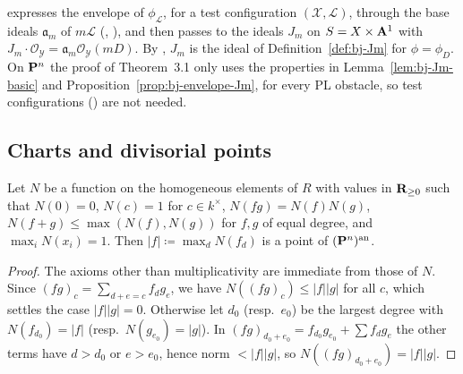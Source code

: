\begin{remark}\label{rmk:bj-test-configurations}
\cite[Proposition~2.5(2)]{FHX} expresses the envelope of $\phi_{\mathcal L}$, for a test configuration
$(\mathcal X,\mathcal L)$, through the base ideals $\mathfrak a_m$ of $m\mathcal L$ (\cite[Lemma~5.22]{BJ22},
\cite[Lemmas~1.6, 1.7]{BJadd}), and \cite[\S3]{FHX} then passes to the ideals $J_m$ on
$S=X\times\mathbf{A}^1$ with $J_m\cdot\mathcal O_{\mathcal Y}=\mathfrak a_m\mathcal O_{\mathcal Y}(mD)$. By
\cite[Lemma~1.7]{BJadd}, $J_m$ is the ideal of Definition~\ref{def:bj-Jm} for $\phi=\phi_D$. On $\mathbf{P}^n$ the
proof of Theorem~3.1 only uses the properties in Lemma~\ref{lem:bj-Jm-basic} and
Proposition~\ref{prop:bj-envelope-Jm}, for every PL obstacle, so test configurations
(\cite[Theorem~2.31]{BJ22}) are not needed.
\end{remark}

\subsection{Charts and divisorial points}

\begin{lemma}\label{lem:bj-graded-extension}
\leanok
{}
Let $N$ be a function on the homogeneous elements of $R$ with values in $\mathbf{R}_{\ge0}$ such that $N(0)=0$,
$N(c)=1$ for $c\in k^\times$, $N(fg)=N(f)N(g)$, $N(f+g)\le\max(N(f),N(g))$ for $f,g$ of equal degree, and
$\max_iN(x_i)=1$. Then $|f|\coloneqq\max_dN(f_d)$ is a point of $(\mathbf{P}^n)^{\mathrm{an}}$.
\end{lemma}

\begin{proof}
The axioms other than multiplicativity are immediate from those of $N$. Since
$(fg)_c=\sum_{d+e=c}f_dg_e$, we have $N((fg)_c)\le|f||g|$ for all $c$, which settles the case $|f||g|=0$. Otherwise
let $d_0$ (resp.\ $e_0$) be the largest degree with $N(f_{d_0})=|f|$ (resp.\ $N(g_{e_0})=|g|$). In
$(fg)_{d_0+e_0}=f_{d_0}g_{e_0}+\sum f_dg_e$ the other terms have $d>d_0$ or $e>e_0$, hence norm $<|f||g|$, so
$N((fg)_{d_0+e_0})=|f||g|$.
\end{proof}

